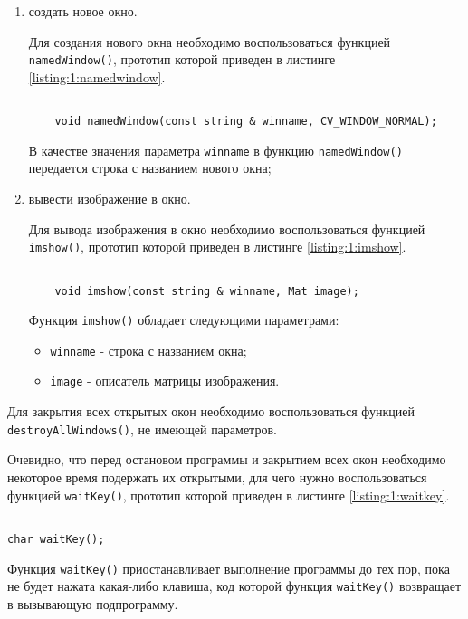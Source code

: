 \begin{enumerate}

	\item создать новое окно.
	
	Для создания нового окна необходимо воспользоваться функцией \verb|namedWindow()|, прототип которой приведен в листинге \ref{listing:1:namedwindow}.

	\begin{lstlisting}

	void namedWindow(const string & winname, CV_WINDOW_NORMAL);

	\end{lstlisting}
	\mylistingend

	В качестве значения параметра \verb|winname| в функцию \verb|namedWindow()| передается строка с названием нового окна;

	\item вывести изображение в окно.

	Для вывода изображения в окно необходимо воспользоваться функцией \verb|imshow()|, прототип которой приведен в листинге \ref{listing:1:imshow}.

	\begin{lstlisting}

	void imshow(const string & winname, Mat image);

	\end{lstlisting}
	\mylistingend

	Функция \verb|imshow()| обладает следующими параметрами:

	\begin{itemize}

		\item \verb|winname| - строка с названием окна;
		\item \verb|image| - описатель матрицы изображения.

	\end{itemize}

\end{enumerate}

Для закрытия всех открытых окон необходимо воспользоваться функцией \linebreak \verb|destroyAllWindows()|, не имеющей параметров.

Очевидно, что перед остановом программы и закрытием всех окон необходимо некоторое время подержать их открытыми, для чего нужно воспользоваться функцией \verb|waitKey()|, прототип которой приведен в листинге \ref{listing:1:waitkey}.

\begin{lstlisting}

char waitKey();

\end{lstlisting}
\mylistingend

Функция \verb|waitKey()| приостанавливает выполнение программы до тех пор, пока не будет нажата какая-либо клавиша, код которой функция \verb|waitKey()| возвращает в вызывающую подпрограмму.

